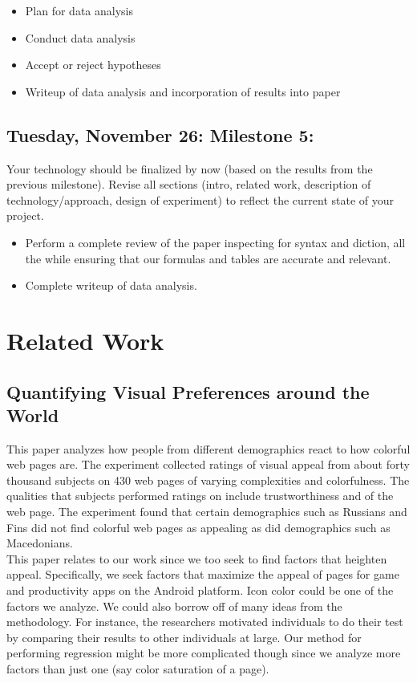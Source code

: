 \documentclass{article}
\begin{document}
\begin{itemize}
\item Plan for data analysis 
\item Conduct data analysis
\item Accept or reject hypotheses
\item Writeup of data analysis and incorporation of results into paper 
\end{itemize}

\subsection{Tuesday, November 26: Milestone 5:}

Your technology should be finalized by now (based on the results from the previous milestone). Revise all sections (intro, related work, description of technology/approach, design of experiment) to reflect the current state of your project. \\

\begin{itemize}
\item Perform a complete review of the paper inspecting for syntax and diction, all the while ensuring that our formulas and tables are accurate and relevant.
\item Complete writeup of data analysis.
\end{itemize}

\section{Related Work}

\subsection{Quantifying Visual Preferences around the World}
This paper analyzes how people from different demographics react to how colorful web pages are. The experiment collected ratings of visual appeal from about forty thousand subjects on 430 web pages of varying complexities and colorfulness. The qualities that subjects performed ratings on include trustworthiness and  of the web page. The experiment found that certain demographics such as Russians and Fins did not find colorful web pages as appealing as did demographics such as Macedonians. \\

This paper relates to our work since we too seek to find factors that heighten appeal. Specifically, we seek factors that maximize the appeal of pages for game and productivity apps on the Android platform. Icon color could be one of the factors we analyze. We could also borrow off of many ideas from the methodology. For instance, the researchers motivated individuals to do their test by comparing their results to other individuals at large. Our method for performing regression might be more complicated though since we analyze more factors than just one (say color saturation of a page). \\
\end{document}
